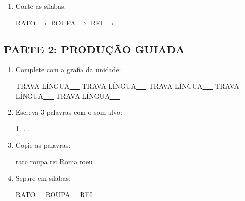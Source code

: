 \begin{exercicio}
\begin{enumerate}
  \item Conte as sílabas:
  \begin{center}
  RATO $\rightarrow$ \underline{\hspace{0.9cm}} \quad ROUPA $\rightarrow$ \underline{\hspace{0.9cm}} \quad REI $\rightarrow$ \underline{\hspace{0.9cm}}
  \end{center}

\end{enumerate}

\subsection*{PARTE 2: PRODUÇÃO GUIADA}

\begin{enumerate}[resume]

  \item Complete com a grafia da unidade:
  \begin{center}
  TRAVA-LÍNGUA\underline{~~~} \quad TRAVA-LÍNGUA\underline{~~~} \quad TRAVA-LÍNGUA\underline{~~~} \quad TRAVA-LÍNGUA\underline{~~~} \quad TRAVA-LÍNGUA\underline{~~~}
  \end{center}

  \item Escreva 3 palavras com o som-alvo:
  \begin{center}
  1. \underline{\hspace{3cm}} . \underline{\hspace{3cm}} . \underline{\hspace{3cm}}
  \end{center}

  \item Copie as palavras:
  \begin{center}
  rato \quad roupa \quad rei \quad Roma \quad roeu
  \end{center}

  \item Separe em sílabas:
  \begin{center}
  RATO = \underline{\hspace{1cm}} \underline{\hspace{1cm}} \quad ROUPA = \underline{\hspace{1cm}} \underline{\hspace{1cm}} \quad REI = \underline{\hspace{1cm}} \underline{\hspace{1cm}}
  \end{center}


\end{enumerate}
\end{exercicio}
